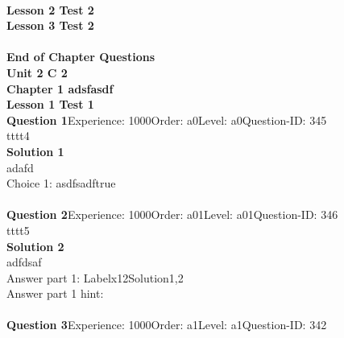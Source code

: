 \documentclass{article}
\begin{document}
\\[4pt]
\noindent\huge{\textbf{Lesson 2 Test 2}}\\[12pt]
\noindent\huge{\textbf{Lesson 3 Test 2}}\\[12pt]
\\[2pt]
\noindent\large{\textbf{End of Chapter Questions}}\\[15pt]
\noindent\huge{\textbf{Unit 2 C 2}}\\[18pt]
\noindent\huge{\textbf{Chapter 1 adsfasdf}}\\[15pt]
\noindent\huge{\textbf{Lesson 1 Test 1}}\\[12pt]
\noindent\textbf{Question 1}\hspace{20pt}Experience: 1000\hspace{20pt}Order: a0\hspace{20pt}Level: a0\hspace{20pt}Question-ID: 345\\[2pt]
tttt4\\[4pt]
\noindent\textbf{Solution 1}\\[2pt]
adafd\\[4pt]
Choice 1: \hspace{20pt}asdfsadf\hspace{20pt}true\\
\\[4pt]
\noindent\textbf{Question 2}\hspace{20pt}Experience: 1000\hspace{20pt}Order: a01\hspace{20pt}Level: a01\hspace{20pt}Question-ID: 346\\[2pt]
tttt5\\[4pt]
\noindent\textbf{Solution 2}\\[2pt]
adfdsaf\\[4pt]
Answer part 1: \hspace{10pt}Label\hspace{10pt}x12\hspace{10pt}Solution\hspace{10pt}1,2\\
Answer part 1 hint: \hspace{15pt}\\
\\[4pt]
\noindent\textbf{Question 3}\hspace{20pt}Experience: 1000\hspace{20pt}Order: a1\hspace{20pt}Level: a1\hspace{20pt}Question-ID: 342\\[2pt]
\end{document}
